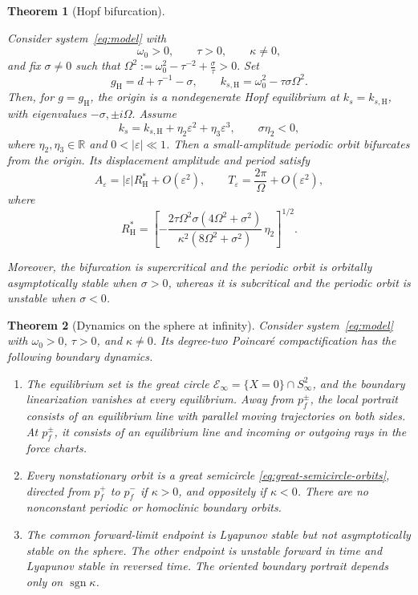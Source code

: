 \documentclass[11pt,reqno]{amsart}
\theoremstyle{plain}
\newtheorem{theorem}{Theorem}[section]
\theoremstyle{definition}
\theoremstyle{remark}
\begin{document}
\begin{theorem}[Hopf bifurcation]
\label{subsec:classical-Hopf-main-theorem}

Consider system~\eqref{eq:model} with
\[
\omega_0>0,\qquad \tau>0,\qquad \kappa\neq0,
\]
and fix $\sigma\neq0$ such that
$
\Omega^2:=\omega_0^2-\tau^{-2}+\frac{\sigma}{\tau}>0.
$
Set
\[
g_{\mathrm H}=d+\tau^{-1}-\sigma,
\qquad
k_{s,\mathrm H}=\omega_0^2-\tau\sigma\Omega^2.
\]
Then, for $g=g_{\mathrm H}$, the origin is a nondegenerate Hopf
equilibrium at $k_s=k_{s,\mathrm H}$, with eigenvalues
$
-\sigma, \pm i\Omega.
$
Assume
\[
k_s=k_{s,\mathrm H}
+\eta_2\varepsilon^2+\eta_3\varepsilon^3,
\qquad
\sigma\eta_2<0,
\]
where $\eta_2,\eta_3\in\mathbb R$ and $0<|\varepsilon|\ll1$.
Then a small-amplitude periodic orbit bifurcates from the origin.
Its displacement amplitude and period satisfy
\[
A_\varepsilon
=
|\varepsilon|R_{\mathrm H}^*
+O(\varepsilon^2),
\qquad
T_\varepsilon
=
\frac{2\pi}{\Omega}
+O(\varepsilon^2),
\]
where
\[
R_{\mathrm H}^*
=
\left[
-\frac{
2\tau\Omega^2\sigma(4\Omega^2+\sigma^2)
}{
\kappa^2(8\Omega^2+\sigma^2)
}\,\eta_2
\right]^{1/2}.
\]

Moreover, the bifurcation is supercritical and the periodic orbit
is orbitally asymptotically stable when $\sigma>0$, whereas it is
subcritical and the periodic orbit is unstable when $\sigma<0$.
\end{theorem}

\begin{theorem}[Dynamics on the sphere at infinity]
\label{thm:dynamics-at-infinity}
Consider system~\eqref{eq:model} with $\omega_0>0$,
$\tau>0$, and $\kappa\neq0$. Its degree-two Poincar\'e
compactification has the following boundary dynamics.
\begin{enumerate}
\item
The equilibrium set is the great circle
$\mathcal E_\infty=\{X=0\}\cap S_\infty^2$, and the
boundary linearization vanishes at every equilibrium.
Away from $p_f^\pm$, the local portrait consists of an
equilibrium line with parallel moving trajectories on
both sides. At $p_f^\pm$, it consists of an equilibrium
line and incoming or outgoing rays in the force charts.
\item
Every nonstationary orbit is a great semicircle
\eqref{eq:great-semicircle-orbits}, directed from $p_f^+$
to $p_f^-$ if $\kappa>0$, and oppositely if $\kappa<0$.
There are no nonconstant periodic or homoclinic boundary
orbits.
\item
The common forward-limit endpoint is Lyapunov stable
but not asymptotically stable on the sphere. The other
endpoint is unstable forward in time and Lyapunov stable
in reversed time. The oriented boundary portrait depends
only on $\operatorname{sgn}\kappa$.
\end{enumerate}
\end{theorem}
\end{document}
